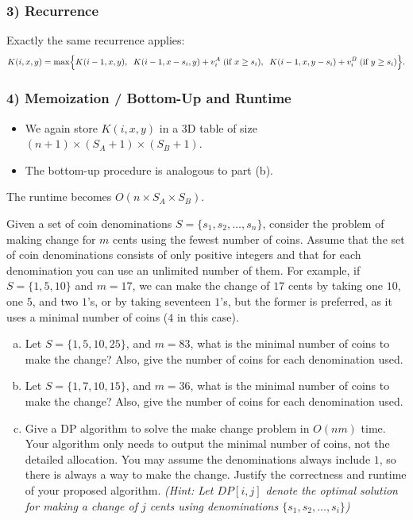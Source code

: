\documentclass[11pt]{article}
\begin{document}
    \subsubsection*{3) Recurrence}
    
    Exactly the same recurrence applies:
    \[
    K(i,x,y) 
    = 
    \max\Bigl\{
        K(i-1, x, y),\;\;
        K(i-1, x - s_i, y) + v_i^A \;\text{(if } x \ge s_i),\;\;
        K(i-1, x, y - s_i) + v_i^B \;\text{(if } y \ge s_i)
    \Bigr\}.
    \]
    
    \subsubsection*{4) Memoization / Bottom-Up and Runtime}
    
    \begin{itemize}
        \item We again store \(K(i,x,y)\) in a 3D table of size \((n+1) \times (S_A+1) \times (S_B+1)\).
        \item The bottom-up procedure is analogous to part (b).
    \end{itemize}
    The runtime becomes \(O(n \times S_A \times S_B)\).
    

    \newpage

    \begin{tcolorbox}[title={Problem 2 (Make Change, 50 points)}] \setlength\parindent{1em}
        
     Given a set of coin denominations $S=\{s_1, s_2,\dots, s_n\}$, consider the problem of making change for $m$ cents using the fewest
        number of coins. Assume that the set of coin denominations consists of only positive integers and that for each denomination you can use an unlimited number of them. For example, if $S=\{1, 5, 10\}$ and $m=17$, we can make the change of $17$ cents by taking one $10$, one $5$, and two $1$'s, or by taking seventeen $1$'s, but the former is preferred, as it uses a minimal number of coins ($4$ in this case).

    \begin{enumerate}[(a)]
    \item Let $S=\{1, 5, 10, 25\}$, and $m=83$, what is the minimal number of coins to make the change? Also, give the number of coins for each denomination used.
    \item Let $S=\{1, 7, 10, 15\}$, and $m=36$, what is the minimal number of coins to make the change? Also, give the number of coins for each denomination used.
    \item Give a DP algorithm to solve the make change problem in $O(nm)$ time. Your algorithm only needs to output the minimal number of coins, not the detailed allocation. You may assume the denominations always include $1$, so there is always a way to make the change. Justify the correctness and runtime of your proposed algorithm. \textit{(Hint: Let $DP[i,j]$ denote the optimal solution for making a change of $j$ cents using denominations $\{s_1, s_2, \dots, s_i\}$)}
    \end{enumerate}
    \end{tcolorbox}
    
    
    \newpage

    
    
\end{document}

